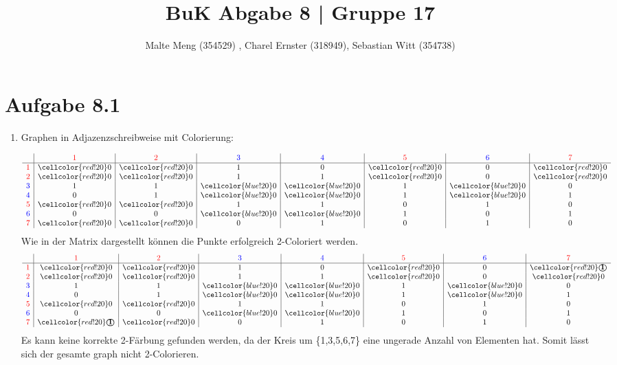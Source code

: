 \documentclass{article}
\title{BuK Abgabe 8 | Gruppe 17}
\author{Malte Meng (354529) , Charel Ernster (318949), Sebastian Witt (354738)}
\newcommand{\rt}{\color{red}}
\newcommand{\bt}{\color{blue}}
\newcommand{\rc}{\cellcolor{red!20}}
\newcommand{\bc}{\cellcolor{blue!20}}
\begin{document}
	\maketitle 
	\section[a 8.1]{Aufgabe 8.1}
	\begin{enumerate}[label=(\alph*).]
		\item Graphen in Adjazenzschreibweise mit Colorierung:
		
		\begin{equation}
			\begin{array}{l | c | c | c | c | c | c | c}
				\ & \rt1 &  \rt2 & \bt3 & \bt4 & \rt5 & \bt6 & \rt7\\
				\hline
				\rt1& \rc0 & \rc0 & 1 & 0 & \rc0 & 0 & \rc0\\
				\rt2& \rc0 & \rc0 & 1 & 1 & \rc0 & 0 & \rc0\\
				\bt3& 1 & 1 & \bc0 & \bc0 & 1 & \bc0 & 0\\
				\bt4& 0 & 1 & \bc0 & \bc0 & 1 & \bc0 & 1\\
				\rt5& \rc0 & \rc0 & 1 & 1 & 0 & 1 & 0\\
				\bt6& 0 & 0 & \bc0 & \bc0 & 1 & 0 & 1\\
				\rt7& \rc0 & \rc0 & 0 & 1 & 0 & 1 & 0\\
			\end{array}
		\end{equation}
		Wie in der Matrix dargestellt können die Punkte erfolgreich 2-Coloriert werden.
		\begin{equation}
			\begin{array}{l | c | c | c | c | c | c | c}
				 & \rt1 &  \rt2 & \bt3 & \bt4 & \rt5 & \bt6 & \rt7\\
				\hline
				\rt1& \rc0 & \rc0 & 1 & 0 & \rc0 & 0 & \rc\textbf{\textcircled{1}}\\
				\rt2& \rc0 & \rc0 & 1 & 1 & \rc0 & 0 & \rc0\\
				\bt3& 1 & 1 & \bc0 & \bc0 & 1 & \bc0 & 0\\
				\bt4& 0 & 1 & \bc0 & \bc0 & 1 & \bc0 & 1\\
				\rt5& \rc0 & \rc0 & 1 & 1 & 0 & 1 & 0\\
				\bt6& 0 & 0 & \bc0 & \bc0 & 1 & 0 & 1\\
				\rt7& \rc\textbf{\textcircled{1}} & \rc0 & 0 & 1 & 0 & 1 & 0\\
			\end{array}
		\end{equation}
		Es kann keine korrekte 2-Färbung gefunden werden, da der Kreis um \{1,3,5,6,7\} eine ungerade Anzahl von Elementen hat. Somit lässt sich der gesamte graph nicht 2-Colorieren.
		

\end{enumerate}
\end{document}
